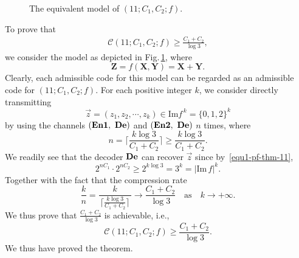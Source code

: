 \documentclass[11pt,draftclsnofoot,onecolumn]{IEEEtran}
\def\Im{\mathrm{Im}}
\newcommand{\Enone}{\bf{En1}}
\newcommand{\Entwo}{\bf{En2}}
\newcommand{\De}{\bf{De}}
\begin{document}
\begin{IEEEproof}
\begin{figure}[t]
 \centering
  {
}
\caption{The equivalent model of $(11;C_1,C_2;f)$.}\label{fig:System_use-11-eqv-mod}
\end{figure}
To prove that
\begin{align*}
\mathcal{C}(11;C_1,C_2;f)\geq\frac{C_1+C_2}{\log3},
\end{align*}
we consider the model as depicted in
Fig.\,\ref{fig:System_use-11-eqv-mod}, where $$\boldsymbol{Z}=f(\boldsymbol{X},\boldsymbol{Y})=\boldsymbol{X}+\boldsymbol{Y}.$$
Clearly, each admissible code for this model can  be regarded as an admissible code for $(11;C_1,C_2;f)$. For each positive integer $k$, we consider directly transmitting
\begin{equation*}
\vec{z}=(z_1,z_2,\cdots,z_k)\in \Im f^{\,k}=\{0,1,2\}^k
\end{equation*}
by using the channels  $(\Enone,~\De)$ and $(\Entwo,~\De)$ $n$ times, where
\begin{equation}\label{equ1-pf-thm-11}
n=\bigg\lceil\frac{k\log 3}{C_1+C_2}\bigg\rceil\geq \frac{k\log 3}{C_1+C_2}.
\end{equation}
We readily see that the decoder $\De$ can recover $\vec{z}$ since by~\eqref{equ1-pf-thm-11},
\begin{equation*}
2^{nC_1}\cdot 2^{nC_2}\geq 2^{k\log3}=3^k=|\Im\,f|^k.
\end{equation*}
Together with the fact that the compression rate
\begin{equation*}
\frac{k}{n}=\dfrac{k}{\,\Big\lceil\frac{k\log 3}{C_1+C_2}\Big\rceil\,} \to \frac{C_1+C_2}{\log3}\quad\text{as}\quad  k\to+\infty.
\end{equation*}
We thus prove that $\frac{C_1+C_2}{\log3}$ is achievable, i.e.,
 \begin{equation*}
\mathcal{C}(11;C_1,C_2;f)\geq\frac{C_1+C_2}{\log3}.\label{11-case-low-bound}
\end{equation*}
We thus have proved the theorem.
\end{IEEEproof}
\end{document}
